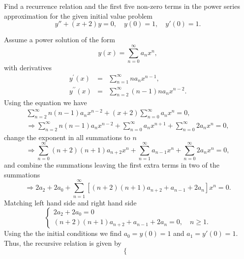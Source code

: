 \documentclass[11pt]{article}
\begin{document}
\begin{problem}
{Find a recurrence relation and the first five non-zero terms in the power series approximation for the given initial value problem}
\begin{equation*}
y'' + (x+2)y = 0, \quad y(0)=1, \quad y'(0)=1.
\end{equation*}
\end{problem}
\begin{solution}
Assume a power solution of the form
\begin{equation*}
y(x) = \sum_{n=0}^{\infty} a_{n} x^n,
\end{equation*}
with derivatives
\begin{eqnarray*}
y^{\prime}(x) & = & \sum_{n=1}^{\infty} n a_{n} x^{n-1}, \\
y^{\prime \prime}(x) & = & \sum_{n=2}^{\infty} (n-1)n a_{n} x^{n-2}.
\end{eqnarray*}
Using the equation we have
\begin{gather*}
\sum_{n=2}^{\infty}n(n-1) a_{n} x^{n-2} + (x+2)\sum_{n=0}^{\infty} a_{n} x^n = 0,\\
\Rightarrow \sum_{n=2}^{\infty}n(n-1) a_{n} x^{n-2} + \sum_{n=0}^{\infty} a_{n} x^{n+1} + \sum_{n=0}^{\infty} 2a_{n} x^n = 0,
\end{gather*}
change the exponent in all summations to $n$
\begin{equation*}
\Rightarrow \sum_{n=0}^{\infty}(n+2)(n+1) a_{n+2} x^{n} + \sum_{n=1}^{\infty} a_{n-1} x^{n} + \sum_{n=0}^{\infty} 2a_{n} x^n = 0,
\end{equation*}
and combine the summations leaving the first extra terms in two of the summations
\begin{equation*}
\Rightarrow 2a_{2} + 2 a_{0} + \sum_{n=1}^{\infty}\left[(n+2)(n+1) a_{n+2} + a_{n-1} + 2a_{n}\right] x^n = 0.
\end{equation*}
Matching left hand side and right hand side
\begin{equation*}
\begin{cases}
2a_{2} +2a_{0}=0 \\
(n+2)(n+1)a_{n+2} + a_{n-1} + 2a_{n} =0, \quad n\geq1.
\end{cases}
\end{equation*}
Using the the initial conditions we find $a_{0}=y(0)=1$ and $a_{1}=y'(0)=1$. Thus, the recursive relation is given by
\begin{equation*}
\boxed{\begin{cases}

\end{cases}}
\end{equation*}
\end{solution}
\end{document}
